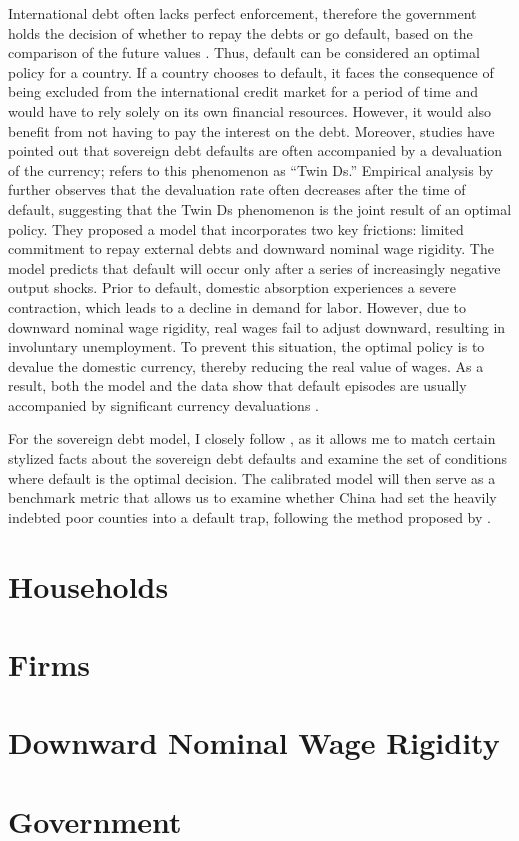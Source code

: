 International debt often lacks perfect enforcement, therefore the government holds the decision of whether to repay the debts or go default, based on the comparison of the future values \citep*{Eaton-Gersovitz-81}. Thus, default can be considered an optimal policy for a country.
If a country chooses to default, it faces the consequence of being excluded from the international credit market for a period of time and  would have to rely solely on its own financial resources. However, it would also benefit from not having to pay the interest on the debt.
Moreover, studies have pointed out that sovereign debt defaults are often accompanied by a devaluation of the currency; \citet*{Reinhart02} refers to this phenomenon as ``Twin Ds.''
Empirical analysis by \citet*{Na-18} further observes that the devaluation rate often decreases after the time of default, suggesting that the Twin Ds phenomenon is the joint result of an optimal policy.
They proposed a model that incorporates two key frictions: limited commitment to repay external debts and downward nominal wage rigidity.
The model predicts that default will occur only after a series of increasingly negative output shocks. Prior to default, domestic absorption experiences a severe contraction, which leads to a decline in demand for labor. However, due to downward nominal wage rigidity, real wages fail to adjust downward, resulting in involuntary unemployment. To prevent this situation, the optimal policy is to devalue the domestic currency, thereby reducing the real value of wages. As a result, both the model and the data show that default episodes are usually accompanied by significant currency devaluations \citep*{Na-18}.

For the sovereign debt model, I closely follow \citet*{Na-18}, as it allows me to match certain stylized facts about the sovereign debt defaults and examine the set of conditions where default is the optimal decision.
The calibrated model will then serve as a benchmark metric that allows us to examine whether China had set the heavily indebted poor counties into a default trap, following the method proposed by \citet*{Hinrichsen_2020-chapter4}.

\section{Households}


\section{Firms}


\section{Downward Nominal Wage Rigidity}


\section{Government}

